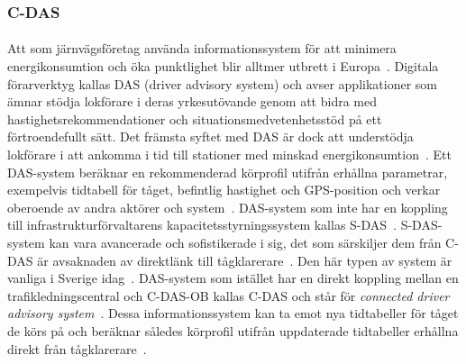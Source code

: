 \subsubsection{C-DAS}\label{subsubsec:c-das-litteraturstudie}
\paragraph{}
\hspace{-12pt}
Att som järnvägsföretag använda informationssystem för att minimera energikonsumtion och öka punktlighet blir alltmer utbrett i Europa~\cite{Bae2014, Kamenicky2016, Konstantinos2013, Cwil2018, Tschirner2013, Yang2013, Joborn2023}.
Digitala förarverktyg kallas DAS (driver advisory system) och avser applikationer som ämnar stödja lokförare i deras yrkesutövande genom att bidra med hastighetsrekommendationer och situationsmedvetenhetsstöd på ett förtroendefullt sätt.
Det främsta syftet med DAS är dock att understödja lokförare i att ankomma i tid till stationer med minskad energikonsumtion~\cite{IRS90940}.
Ett DAS-system beräknar en rekommenderad körprofil utifrån erhållna parametrar, exempelvis tidtabell för tåget, befintlig hastighet och GPS-position och verkar oberoende av andra aktörer och system~\cite{IRS90940}.
DAS-system som inte har en koppling till infrastrukturförvaltarens kapacitetsstyrningssystem kallas S-DAS~\cite{IRS90940, Joborn2023, Angel2020, Olsson2023}.
S-DAS-system kan vara avancerade och sofistikerade i sig, det som särskiljer dem från C-DAS är avsaknaden av direktlänk till tågklarerare~\cite{IRS90940, Joborn2023, Angel2020, Olsson2023}.
Den här typen av system är vanliga i Sverige idag~\cite{Systemdefinition2019}.
DAS-system som istället har en direkt koppling mellan en trafikledningscentral och C-DAS-OB kallas C-DAS och står för \emph{connected driver advisory system}~\cite{Bae2014, Kamenicky2016, Konstantinos2013, Cwil2018, Tschirner2013, Yang2013, Joborn2023}.
Dessa informationssystem kan ta emot nya tidtabeller för tåget de körs på och beräknar således körprofil utifrån uppdaterade tidtabeller erhållna direkt från tågklarerare~\cite{Bae2014, Kamenicky2016, Konstantinos2013, Cwil2018, Tschirner2013, Yang2013, Joborn2023}.
